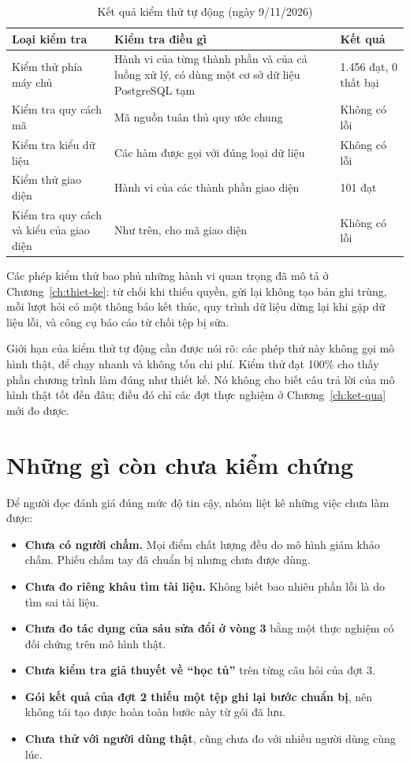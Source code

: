 \begin{table}[!htbp]
\caption{Kết quả kiểm thử tự động (ngày 9/11/2026)}
\label{tab:kiem-thu}
\cobang
\begin{tabularx}{\linewidth}{P{4.6cm}YR{3.4cm}}
\toprule
\textbf{Loại kiểm tra} & \textbf{Kiểm tra điều gì} & \textbf{Kết quả}\\
\midrule
Kiểm thử phía máy chủ & Hành vi của từng thành phần và của cả luồng xử lý, có dùng một cơ sở dữ liệu PostgreSQL tạm & 1.456 đạt, 0 thất bại\\
Kiểm tra quy cách mã & Mã nguồn tuân thủ quy ước chung & Không có lỗi\\
Kiểm tra kiểu dữ liệu & Các hàm được gọi với đúng loại dữ liệu & Không có lỗi\\
Kiểm thử giao diện & Hành vi của các thành phần giao diện & 101 đạt\\
Kiểm tra quy cách và kiểu của giao diện & Như trên, cho mã giao diện & Không có lỗi\\
\bottomrule
\end{tabularx}
\end{table}

Các phép kiểm thử bao phủ những hành vi quan trọng đã mô tả ở Chương~\ref{ch:thiet-ke}: từ chối khi thiếu quyền, gửi lại không tạo bản ghi trùng, mỗi lượt hỏi có một thông báo kết thúc, quy trình dữ liệu dừng lại khi gặp dữ liệu lỗi, và công cụ báo cáo từ chối tệp bị sửa.

Giới hạn của kiểm thử tự động cần được nói rõ: các phép thử này không gọi mô hình thật, để chạy nhanh và không tốn chi phí. Kiểm thử đạt 100\% cho thấy phần chương trình làm đúng như thiết kế. Nó không cho biết câu trả lời của mô hình thật tốt đến đâu; điều đó chỉ các đợt thực nghiệm ở Chương~\ref{ch:ket-qua} mới đo được.

\section{Những gì còn chưa kiểm chứng}

Để người đọc đánh giá đúng mức độ tin cậy, nhóm liệt kê những việc chưa làm được:

\begin{itemize}
    \item \textbf{Chưa có người chấm.} Mọi điểm chất lượng đều do mô hình giám khảo chấm. Phiếu chấm tay đã chuẩn bị nhưng chưa được dùng.
    \item \textbf{Chưa đo riêng khâu tìm tài liệu.} Không biết bao nhiêu phần lỗi là do tìm sai tài liệu.
    \item \textbf{Chưa đo tác dụng của sáu sửa đổi ở vòng 3} bằng một thực nghiệm có đối chứng trên mô hình thật.
    \item \textbf{Chưa kiểm tra giả thuyết về ``học tủ''} trên từng câu hỏi của đợt 3.
    \item \textbf{Gói kết quả của đợt 2 thiếu một tệp ghi lại bước chuẩn bị}, nên không tái tạo được hoàn toàn bước này từ gói đã lưu.
    \item \textbf{Chưa thử với người dùng thật}, cũng chưa đo với nhiều người dùng cùng lúc.
\end{itemize}

